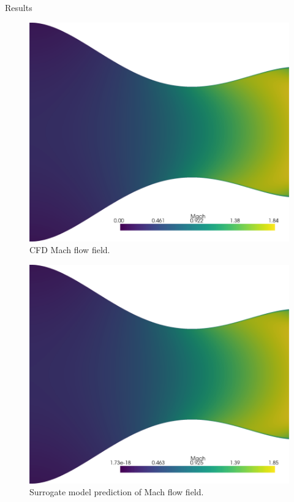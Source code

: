 \begin{frame}{Results}
\begin{figure}
\hypertarget{fig:cfd_mach}{%
\centering
\includegraphics{figures/Mach_field_cfd.png}
\caption{CFD Mach flow field.}\label{fig:cfd_mach}
}
\end{figure}

\begin{figure}
\hypertarget{fig:prediction_mach}{%
\centering
\includegraphics{figures/Mach_field_reconstructed.png}
\caption{Surrogate model prediction of Mach flow
field.}\label{fig:prediction_mach}
}
\end{figure}


\end{frame}
